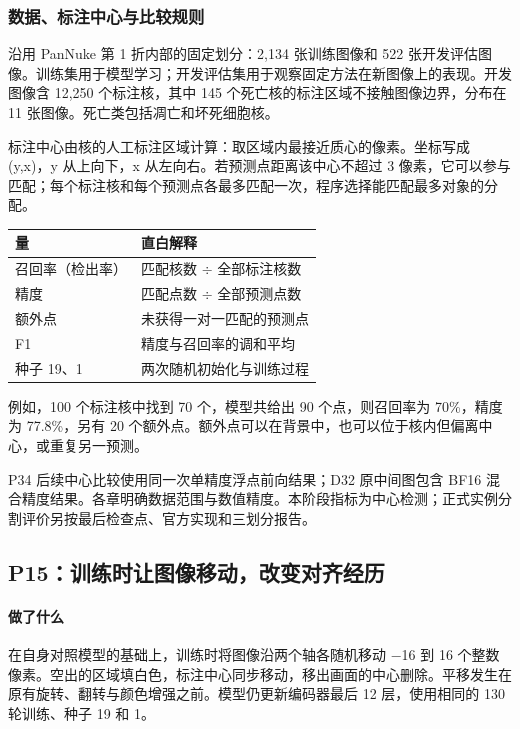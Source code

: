 \documentclass[
  12pt,
  fontset=fandol]{ctexart}
\newcounter{none} %
\begin{document}
\subsubsection{数据、标注中心与比较规则}\label{chapter4}
沿用 PanNuke 第 1 折内部的固定划分：2,134 张训练图像和 522 张开发评估图像。训练集用于模型学习；开发评估集用于观察固定方法在新图像上的表现。开发图像含 12,250 个标注核，其中 145 个死亡核的标注区域不接触图像边界，分布在 11 张图像。死亡类包括凋亡和坏死细胞核。

标注中心由核的人工标注区域计算：取区域内最接近质心的像素。坐标写成 (y,x)，y 从上向下，x 从左向右。若预测点距离该中心不超过 3 像素，它可以参与匹配；每个标注核和每个预测点各最多匹配一次，程序选择能匹配最多对象的分配。

{\def\LTcaptype{none}
\begin{longtable}[]{@{}
  >{\raggedright\arraybackslash}p{}
  >{\raggedright\arraybackslash}p{}@{}}
\toprule\noalign{}
量 & 直白解释\\
\midrule\noalign{}
\endhead
\bottomrule\noalign{}
\endlastfoot
召回率（检出率） & 匹配核数 \ensuremath{\div} 全部标注核数\\
精度 & 匹配点数 \ensuremath{\div} 全部预测点数\\
额外点 & 未获得一对一匹配的预测点\\
F1 & 精度与召回率的调和平均\\
种子 19、1 & 两次随机初始化与训练过程\\
\end{longtable}}
例如，100 个标注核中找到 70 个，模型共给出 90 个点，则召回率为 70\%，精度为 77.8\%，另有 20 个额外点。额外点可以在背景中，也可以位于核内但偏离中心，或重复另一预测。

P34 后续中心比较使用同一次单精度浮点前向结果；D32 原中间图包含 BF16 混合精度结果。各章明确数据范围与数值精度。本阶段指标为中心检测；正式实例分割评价另按最后检查点、官方实现和三划分报告。

\subsection{P15：训练时让图像移动，改变对齐经历}\label{chapter5}
\paragraph{做了什么}
在自身对照模型的基础上，训练时将图像沿两个轴各随机移动 \ensuremath{-}16 到 16 个整数像素。空出的区域填白色，标注中心同步移动，移出画面的中心删除。平移发生在原有旋转、翻转与颜色增强之前。模型仍更新编码器最后 12 层，使用相同的 130 轮训练、种子 19 和 1。
\end{document}
